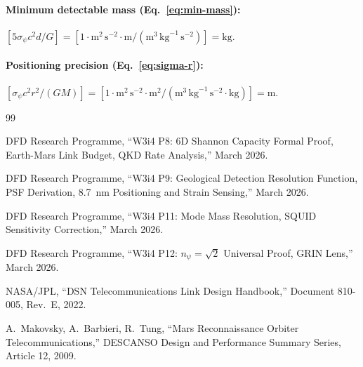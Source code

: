 \documentclass[aps,prd,twocolumn,superscriptaddress,nofootinbib]{revtex4-2}
\begin{document}
\paragraph{Minimum detectable mass (Eq.~\ref{eq:min-mass}):}
$[5\sigma_\psi c^2 d / G]
= [1 \cdot \mathrm{m}^2\,\mathrm{s}^{-2} \cdot \mathrm{m}
/ (\mathrm{m}^3\,\mathrm{kg}^{-1}\,\mathrm{s}^{-2})]
= \mathrm{kg}$. \checkmark

\paragraph{Positioning precision (Eq.~\ref{eq:sigma-r}):}
$[\sigma_\psi c^2 r^2 / (G M)]
= [1 \cdot \mathrm{m}^2\,\mathrm{s}^{-2} \cdot \mathrm{m}^2
/ (\mathrm{m}^3\,\mathrm{kg}^{-1}\,\mathrm{s}^{-2} \cdot \mathrm{kg})]
= \mathrm{m}$. \checkmark

\begin{thebibliography}{99}

DFD Research Programme,
``W3i4 P8: 6D Shannon Capacity Formal Proof, Earth-Mars Link Budget,
QKD Rate Analysis,'' March 2026.

DFD Research Programme,
``W3i4 P9: Geological Detection Resolution Function, PSF Derivation,
8.7~nm Positioning and Strain Sensing,'' March 2026.

DFD Research Programme,
``W3i4 P11: Mode Mass Resolution, SQUID Sensitivity Correction,''
March 2026.

DFD Research Programme,
``W3i4 P12: $n_\psi = \sqrt{2}$ Universal Proof, GRIN Lens,''
March 2026.

NASA/JPL, ``DSN Telecommunications Link Design Handbook,''
Document 810-005, Rev.~E, 2022.

A.~Makovsky, A.~Barbieri, R.~Tung,
``Mars Reconnaissance Orbiter Telecommunications,''
DESCANSO Design and Performance Summary Series, Article 12, 2009.

\end{thebibliography}
\end{document}

